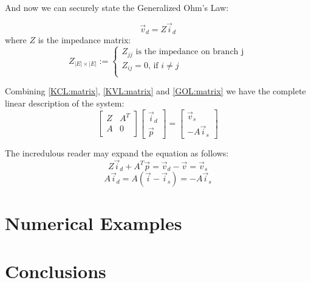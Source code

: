 \documentclass{comjnl}
\begin{document}
And now we can securely state the Generalized Ohm's Law:
\begin{theorem}[GOL]
\label{GOL:matrix}
$$ \vec{v}_{d} = Z \vec{i}_{d} $$
where $Z$ is the impedance matrix:
$$ Z_{|E|\times|E|} :=
\begin{cases} 
Z_{jj} \mbox{ is the impedance on branch j}\\
Z_{ij}=0 \mbox{, if } i\neq j \\
\end{cases}$$
\end{theorem}
Combining \ref{KCL:matrix}, \ref{KVL:matrix} and \ref{GOL:matrix} we have the complete linear description of the system:
\begin{equation}
\begin{bmatrix}
	Z & A^T \\
	A & 0   \\
\end{bmatrix}
\begin{bmatrix}
	\vec{i}_d \\
	\vec{p}
\end{bmatrix}
=
\begin{bmatrix}
	\vec{v}_s \\
	-A\vec{i}_s
\end{bmatrix}
\end{equation}

The incredulous reader may expand the equation as follows:
$$ Z\vec{i}_d + A^T\vec{p} = \vec{v}_d - \vec{v} = \vec{v}_s $$
$$ A\vec{i}_d = A(\vec{i}-\vec{i}_s) = - A\vec{i}_s  $$

\section{Numerical Examples}


\section{Conclusions}
\label{Conclusions}


\nocite{*}



\end{document}
